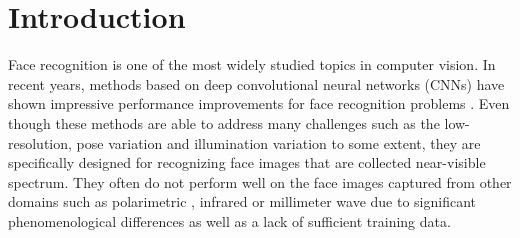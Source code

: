 \documentclass[10pt,twocolumn,letterpaper]{article}
\begin{document}


\section{Introduction}
Face recognition is one of the most widely studied topics in computer vision.  In recent years,
methods based on deep convolutional neural networks (CNNs) have shown impressive performance improvements for face recognition problems \cite{vggface,face_net,face_residue}.   Even though these methods are able to address many challenges such as the low-resolution, pose variation and illumination variation to some extent, they are specifically designed for recognizing face images that are collected near-visible spectrum.  They often do not perform well on the face images captured from other domains such as polarimetric \cite{ ijcb_datasets2, btas_2016, ijcb_datasets}, infrared \cite{Klare_NIR, SWIR_TIFS} or millimeter wave \cite{mmW_ISBA2017} due to significant phenomenological differences as well as a lack of sufficient training data. 
\end{document}
